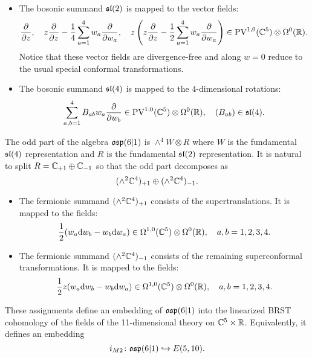 \begin{itemize}
\item The bosonic summand $\mathfrak{sl}(2)$ is mapped to the vector fields:
\[
\frac{\partial}{\partial z} ,\quad z \frac{\partial}{\partial z} - \frac14 \sum_{a=1}^4 w_a \frac{\partial}{\partial w_a} , \quad z \left(z \frac{\partial}{\partial z} - \frac12 \sum_{a=1}^4 w_a \frac{\partial}{\partial w_a} \right) \in {\rm PV}^{1,0}(\mathbb C^5) \otimes \Omega^0(\mathbb R) .
\]
Notice that these vector fields are divergence-free and along $w=0$ reduce to the usual special conformal transformations.
\item The bosonic summand $\mathfrak{sl}(4)$ is mapped to the $4$-dimensional rotations: 
\[
\sum_{a,b=1}^4 B_{ab} w_a \frac{\partial}{\partial w_b} \in {\rm PV}^{1,0}(\mathbb C^5) \otimes \Omega^0(\mathbb R) , \quad (B_{ab}) \in \mathfrak{sl}(4) .
\]
\end{itemize}

The odd part of the algebra $\mathfrak{osp}(6|1)$ is $\wedge^4 W \otimes R$ where $W$ is the fundamental $\mathfrak{sl}(4)$ representation and $R$ is the fundamental $\mathfrak{sl}(2)$ representation. 
It is natural to split $R = \mathbb C_{+1} \oplus \mathbb C_{-1}$ so that the odd part decomposes as
\[
(\wedge^2 \mathbb C^4)_{+1} \oplus (\wedge^2 \mathbb C^4)_{-1} .
\]

\begin{itemize}
\item 
The fermionic summand $(\wedge^2 \mathbb C^4)_{+1}$ consists of the supertranslations. 
It is mapped to the fields: 
\[
\frac{1}{2} (w_a {\rm d} w_b - w_b {\rm d} w_a) \in \Omega^{1,0}(\mathbb C^5) \otimes \Omega^0(\mathbb R) , \quad a,b=1,2,3,4 .
\] 
\item The fermionic summand $(\wedge^2 \mathbb C^4)_{-1}$ consists of the remaining superconformal transformations. 
It is mapped to the fields: 
\[
\frac{1}{2} z (w_a {\rm d} w_b - w_b {\rm d} w_a) \in \Omega^{1,0}(\mathbb C^5) \otimes \Omega^0(\mathbb R) , \quad a,b=1,2,3,4. 
\] 
\end{itemize}


\begin{lem}
These assignments define an embedding of $\mathfrak{osp}(6|1)$ into the linearized BRST cohomology of the fields of the 11-dimensional theory on $\mathbb C^5 \times \mathbb R$. 
Equivalently, it defines an embedding
\[
i_{M2} \colon \mathfrak{osp}(6|1) \hookrightarrow E(5,10) .
\]
\end{lem} 


